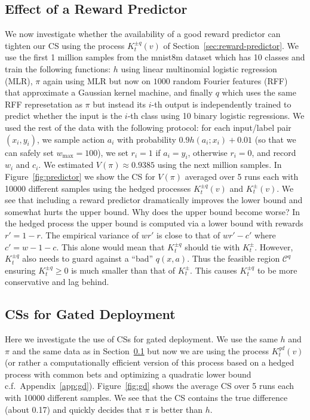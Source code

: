 \subsection{Effect of a Reward Predictor}
\label{sec:rp-experiment}
We now investigate whether the availability of a good 
reward predictor can tighten our CS using the process
$K_t^{\pm q}(v)$ of Section~\ref{sec:reward-predictor}.
We use the first 1 million samples from the mnist8m
dataset which has 10 classes and train the following
functions: $h$ using linear multinomial 
logistic regression (MLR), $\pi$ again using MLR but
now on $1000$ random Fourier 
features (RFF)~\cite{rahimi2007random} that approximate 
a Gaussian kernel machine, and finally $q$ which
uses the same RFF represetation as $\pi$ but instead
its $i$-th output is independently trained 
to predict whether the input is the $i$-th class
using 10 binary logistic regressions.
We used the rest of the data with the following 
protocol: for each input/label pair $(x_i,y_i)$, we sample 
action $a_i$ with probability $0.9h(a_i;x_i)+0.01$
(so that we can safely set $w_{\max}=100$),
we set $r_i=1$ if $a_i=y_i$, otherwise $r_i=0$, 
and record $w_i$ and $c_i$. We estimated 
$V(\pi)\approx 0.9385$ using the next million samples. In Figure~\ref{fig:predictor}
we show the CS for $V(\pi)$ averaged over 5 runs each 
with 10000 different samples using the hedged processes 
$K_t^{\pm q}(v)$ and $K_t^{\pm}(v)$.
We see that including 
a reward predictor dramatically improves the lower bound
and somewhat hurts the upper bound. Why does the upper
bound become worse? In the hedged process the upper bound 
is computed via a lower bound with rewards $r'=1-r$. 
The empirical variance of 
$wr'$ is close to that of 
$wr'-c'$ where $c'=w-1-c$. This alone would 
mean that $K_t^{\pm q}$ should tie with $K_t^{\pm}$.
However, $K_t^{\pm q}$ also needs to guard against
a ``bad'' $q(x,a)$. Thus the feasible region $\mathcal{C}^q$
ensuring $K_t^{\pm q} \geq 0$ is much smaller
than that of $K_t^{\pm}$. This causes $K_t^{\pm q}$
to be more conservative and lag behind.

\subsection{CSs for Gated Deployment}
Here we investigate the use of CSs for gated deployment. 
We use the same $h$ and $\pi$ and the same data as 
in Section~\ref{sec:rp-experiment} but now we are 
using the process $K_t^{gd}(v)$ 
(or rather a computationally efficient version 
of this process based on a hedged process with 
common bets and optimizing a quadratic lower bound
c.f.\ Appendix~\ref{app:gd}).
Figure~\ref{fig:gd} shows the average CS over 5 runs
each with 10000 different samples. We see that the 
CS contains the true difference (about 0.17) and quickly
decides that $\pi$ is better than $h$. 


